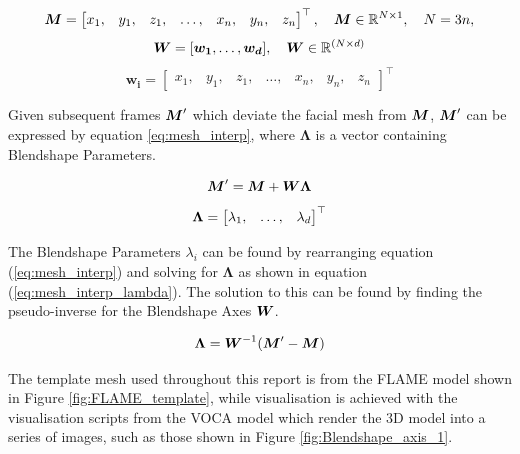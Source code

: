 \begin{equation*}
    {\boldsymbol{{M}}} = \begin{bmatrix} 
                x_{1}, &
                y_{1}, &
                z_{1}, &
                \dots, &
                x_{n}, &
                y_{n}, &
                z_{n}
               \end{bmatrix}^\top,
    \quad
    {\boldsymbol{{M}}} \in \mathbb{R}^{N\times 1},
    \quad
    N = 3n,
\end{equation*}
\quad
\begin{equation*}
    {\boldsymbol{{W}}} = [
               {\boldsymbol{{w_1}}}, \dots, {\boldsymbol{{w_d}}}
              ],
    \quad
    {\boldsymbol{{W}}} \in \mathbb{R}^{(N \times d)}
\end{equation*}
\quad
\begin{equation*}
    \bm{w_i} = \begin{bmatrix} 
                x_{1}, &
                y_{1}, &
                z_{1}, &
                \dots, &
                x_{n}, &
                y_{n}, &
                z_{n}
    \end{bmatrix}^\top
\end{equation*}

Given subsequent frames ${\boldsymbol{{M}}}^{\prime}$ which deviate the facial mesh from ${\boldsymbol{{M}}}$, ${\boldsymbol{{M}}}^{\prime}$ can be expressed by equation \ref{eq:mesh_interp}, where $\bm{\Lambda}$ is a vector containing Blendshape Parameters.

\begin{equation}\label{eq:mesh_interp}
    {\boldsymbol{{M}}}^{\prime} = {\boldsymbol{{M}}} + {\boldsymbol{{W}}} {\boldsymbol{{\Lambda}}}
\end{equation}
\quad
\begin{equation*}
    {\boldsymbol{{\Lambda}}} = \begin{bmatrix}
        \lambda_1, &
        \dots, &
        \lambda_d
    \end{bmatrix}^\top
\end{equation*}

The Blendshape Parameters $\lambda_i$ can be found by rearranging equation (\ref{eq:mesh_interp}) and solving for $\bm{\Lambda}$ as shown in equation (\ref{eq:mesh_interp_lambda}).
The solution to this can be found by finding the pseudo-inverse for the Blendshape Axes ${\boldsymbol{{W}}}$.

\begin{equation}\label{eq:mesh_interp_lambda}
    {\boldsymbol{{\Lambda}}} = {\boldsymbol{{W}}}^{-1}({\boldsymbol{{M}}}^{\prime} - {\boldsymbol{{M}}})
\end{equation}

The template mesh used throughout this report is from the FLAME model \cite{Li2017} shown in Figure \ref{fig:FLAME_template}, while visualisation is achieved with the visualisation scripts from the VOCA model \cite{Cudeiro2019} which render the 3D model into a series of images, such as those shown in Figure \ref{fig:Blendshape_axis_1}.

